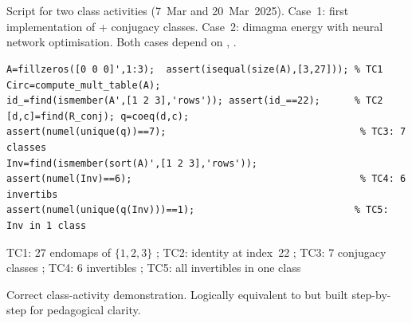 \chapter{}
\begin{tcolorbox}[Abox,title={Analysis}]
Script for two class activities (7~Mar and 20~Mar~2025). Case~1: first implementation of  + conjugacy classes. Case~2: dimagma energy with neural network optimisation. Both cases depend on , .
\end{tcolorbox}
\begin{lstlisting}[caption={Tests for guide4classes2ndweek.m -- case 1}]
A=fillzeros([0 0 0]',1:3);  assert(isequal(size(A),[3,27])); % TC1
Circ=compute_mult_table(A);
id_=find(ismember(A',[1 2 3],'rows')); assert(id_==22);      % TC2
[d,c]=find(R_conj); q=coeq(d,c);
assert(numel(unique(q))==7);                                  % TC3: 7 classes
Inv=find(ismember(sort(A)',[1 2 3],'rows'));
assert(numel(Inv)==6);                                        % TC4: 6 invertibs
assert(numel(unique(q(Inv)))==1);                            % TC5: Inv in 1 class
\end{lstlisting}
\begin{tcolorbox}[Pbox,title={TC1--TC5 -- All pass}]
TC1: 27 endomaps of $\{1,2,3\}$ \APROVADO; TC2: identity at index~22 \APROVADO; TC3: 7 conjugacy classes \APROVADO; TC4: 6 invertibles \APROVADO; TC5: all invertibles in one class \APROVADO
\end{tcolorbox}
\begin{concl}
Correct class-activity demonstration. Logically equivalent to  but built step-by-step for pedagogical clarity.
\end{concl}

